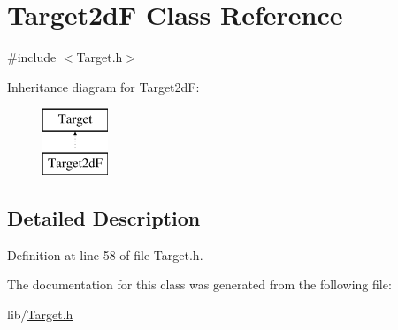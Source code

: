 \hypertarget{class_target2d_f}{}\section{Target2dF Class Reference}
\label{class_target2d_f}


{\ttfamily \#include $<$Target.\+h$>$}

Inheritance diagram for Target2dF\+:\begin{figure}[H]
\begin{center}
\leavevmode
\includegraphics[height=2.000000cm]{class_target2d_f}
\end{center}
\end{figure}


\subsection{Detailed Description}


Definition at line 58 of file Target.\+h.



The documentation for this class was generated from the following file\+:\begin{DoxyCompactItemize}
\item 
lib/\hyperlink{_target_8h}{Target.\+h}\end{DoxyCompactItemize}
